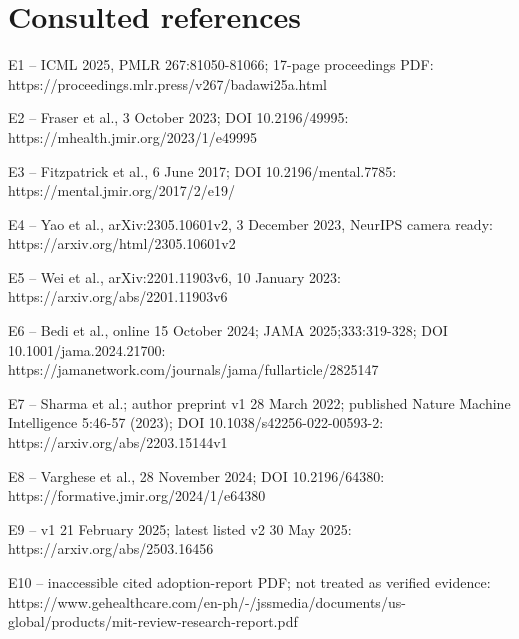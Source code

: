 \documentclass[10pt]{article}
\begin{document}
\section*{Consulted references}
E1 – ICML 2025, PMLR 267:81050-81066; 17-page proceedings PDF: https://proceedings.mlr.press/v267/badawi25a.html\par
E2 – Fraser et al., 3 October 2023; DOI 10.2196/49995: https://mhealth.jmir.org/2023/1/e49995\par
E3 – Fitzpatrick et al., 6 June 2017; DOI 10.2196/mental.7785: https://mental.jmir.org/2017/2/e19/\par
E4 – Yao et al., arXiv:2305.10601v2, 3 December 2023, NeurIPS camera ready: https://arxiv.org/html/2305.10601v2\par
E5 – Wei et al., arXiv:2201.11903v6, 10 January 2023: https://arxiv.org/abs/2201.11903v6\par
E6 – Bedi et al., online 15 October 2024; JAMA 2025;333:319-328; DOI 10.1001/jama.2024.21700: https://jamanetwork.com/journals/jama/fullarticle/2825147\par
E7 – Sharma et al.; author preprint v1 28 March 2022; published Nature Machine Intelligence 5:46-57 (2023); DOI 10.1038/s42256-022-00593-2: https://arxiv.org/abs/2203.15144v1\par
E8 – Varghese et al., 28 November 2024; DOI 10.2196/64380: https://formative.jmir.org/2024/1/e64380\par
E9 – v1 21 February 2025; latest listed v2 30 May 2025: https://arxiv.org/abs/2503.16456\par
E10 – inaccessible cited adoption-report PDF; not treated as verified evidence: https://www.gehealthcare.com/en-ph/-/jssmedia/documents/us-global/products/mit-review-research-report.pdf\par
\end{document}
